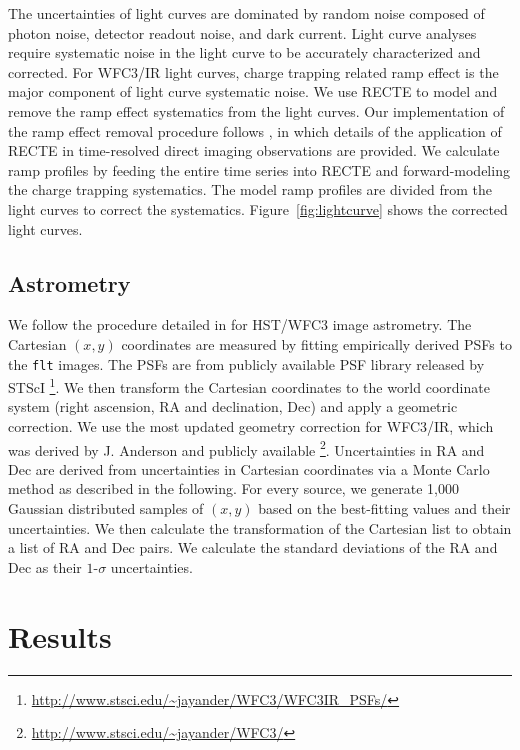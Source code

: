 \documentclass[twocolumn]{aastex62}
\begin{document}
The uncertainties of light curves are dominated by random noise composed of  photon noise, detector readout noise, and dark current. Light curve analyses require systematic noise in the light curve to be accurately characterized and corrected. For WFC3/IR light curves, charge trapping related ramp effect is the major component of light curve systematic noise. We use RECTE \citep{Zhou2017} to model and remove the ramp effect systematics from the light curves. Our implementation of the ramp effect removal procedure follows \citet{Zhou2019}, in which details of the application of RECTE in time-resolved direct imaging observations are provided. We calculate ramp profiles by feeding the entire time series into RECTE and forward-modeling the charge trapping systematics. The model ramp profiles are divided from the light curves to correct the systematics. Figure~\ref{fig:lightcurve} shows the corrected light curves.

\subsection{Astrometry}
We follow the procedure detailed in \citet{Bedin2018} for HST/WFC3 image astrometry. The Cartesian $(x, y)$ coordinates are measured by fitting empirically derived PSFs to the \texttt{flt} images. The PSFs are from publicly available PSF library released by STScI \footnote{\url{http://www.stsci.edu/~jayander/WFC3/WFC3IR\_PSFs/}}. We then transform the Cartesian coordinates to the world coordinate system (right ascension, RA and declination, Dec) and apply a geometric correction. We use the most updated geometry correction for WFC3/IR, which was derived by J. Anderson and publicly available \footnote{\url{http://www.stsci.edu/~jayander/WFC3/}}.  Uncertainties in RA and Dec are derived from uncertainties in Cartesian coordinates via a Monte Carlo method as described in the following. For every source, we generate 1,000 Gaussian distributed samples of $(x, y)$  based on the best-fitting values and their uncertainties. We then calculate the transformation of the Cartesian list  to obtain a list of RA and Dec pairs. We calculate the standard deviations of the RA and Dec as their $1$-$\sigma$ uncertainties.

\section{Results}
\end{document}
